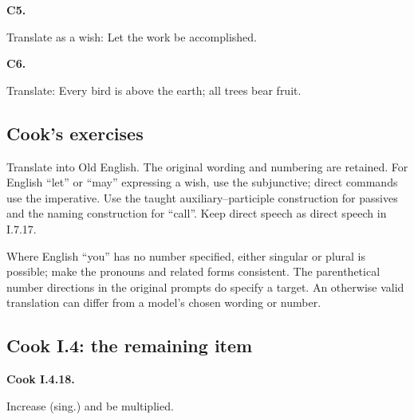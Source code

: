 \par\begin{minipage}{\linewidth}\raggedright
\textbf{C5.}

Translate as a wish: Let the work be accomplished.

\end{minipage}\par\addvspace{4pt}

\par\begin{minipage}{\linewidth}\raggedright
\textbf{C6.}

Translate: Every bird is above the earth; all trees bear fruit.

\end{minipage}\par\addvspace{4pt}

\subsection*{Cook’s exercises}

Translate into Old English. The original wording and numbering are retained. For English “let” or “may” expressing a wish, use the subjunctive; direct commands use the imperative. Use the taught auxiliary–participle construction for passives and the naming construction for “call”. Keep direct speech as direct speech in I.7.17.

Where English “you” has no number specified, either singular or plural is possible; make the pronouns and related forms consistent. The parenthetical number directions in the original prompts do specify a target. An otherwise valid translation can differ from a model’s chosen wording or number.

\subsection*{Cook I.4: the remaining item}

\par\begin{minipage}{\linewidth}\raggedright
\textbf{Cook I.4.18.}

Increase (sing.) and be multiplied.

\end{minipage}\par\addvspace{4pt}

